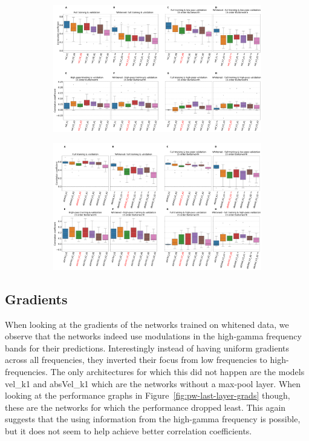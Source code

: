 \begin{figure}[!hpbp]
\begin{subfigure}[a]{\textwidth}
   \includegraphics[width=1\linewidth]{img/ch4/vel-pw-vs-non-pw-performance}
   \caption{}
\end{subfigure}\label{fig:vel-pw-performance}

\begin{subfigure}[b]{\textwidth}
   \includegraphics[width=1\linewidth]{img/ch4/absVel-pw-vs-non-pw-performance}
   \caption{}
\end{subfigure}\label{fig:absVel-pw-performance}
\caption[]{}
\end{figure}\label{fig:pw-performance}

\subsection{Gradients}\label{subsec:pw-gradients2}

When looking at the gradients of the networks trained on whitened data, we observe that the networks indeed use modulations in the high-gamma frequency bands for their predictions.
Interestingly instead of having uniform gradients across all frequencies, they inverted their focus from low frequencies to high-frequencies.
The only architectures for which this did not happen are the models vel\_k1 and absVel\_k1 which are the networks without a max-pool layer.
When looking at the performance graphs in Figure~\ref{fig:pw-last-layer-grads} though, these are the networks for which the performance dropped least.
This again suggests that the using information from the high-gamma frequency is possible, but it does not seem to help achieve better correlation coefficients.

